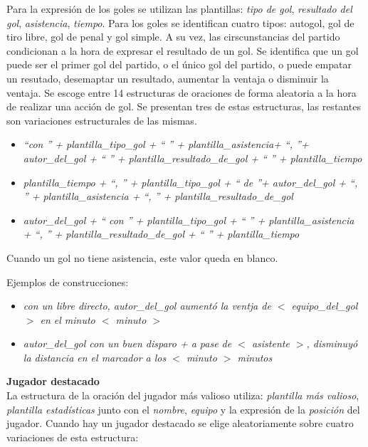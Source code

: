     Para la expresión de los goles se utilizan las plantillas: \textit{tipo de gol}, \textit{resultado del gol}, 
    \textit{asistencia}, \textit{tiempo}. Para los goles se identifican cuatro tipos: autogol, gol de tiro libre, 
    gol de penal y gol simple. A su vez, las cirscunstancias del partido condicionan a la hora de expresar el resultado 
    de un gol. Se identifica que un gol puede ser el primer gol del partido, o el único gol del partido, o puede empatar 
    un resutado, desemaptar un resultado, aumentar la ventaja o disminuir la ventaja.
    Se escoge entre 14 estructuras de oraciones de forma aleatoria a la hora de realizar una acción de gol. Se presentan tres 
    de estas estructuras, las restantes son variaciones estructurales de las mismas.
    

    \begin{itemize}
        \item \textit{ “con ” + plantilla\_tipo\_gol + “ ” + plantilla\_asistencia+ “, ”+ autor\_del\_gol + “ ” + plantilla\_resultado\_de\_gol + “ ” + plantilla\_tiempo}
        \item \textit{plantilla\_tiempo + “, ” + plantilla\_tipo\_gol + “ de ”+ autor\_del\_gol + “, ” + plantilla\_asistencia + “, ” + plantilla\_resultado\_de\_gol}
        \item \textit{autor\_del\_gol + “ con ” + plantilla\_tipo\_gol + “ ” + plantilla\_asistencia + “, ” + plantilla\_resultado\_de\_gol + “ ” + plantilla\_tiempo}
    \end{itemize}

    Cuando un gol no tiene asistencia, este valor queda en blanco.

    Ejemplos de construcciones:

    \begin{itemize}
        \item \textit{con un libre directo, autor\_del\_gol aumentó la ventja de $<$ equipo\_del\_gol $>$ en el minuto $<$ minuto $>$}
        \item \textit{autor\_del\_gol con un buen disparo + a pase de $<$ asistente $>$, disminuyó la distancia en el marcador a los $<$ minuto $>$ minutos} 
    \end{itemize}

\textbf{Jugador destacado}\\

    La estructura de la oración del jugador más valioso utiliza: \textit{plantilla más valioso}, \textit{plantilla estadísticas} junto con el \textit{nombre}, 
\textit{equipo} y la expresión de la  \textit{posición} del jugador.
    Cuando hay un jugador destacado se elige aleatoriamente sobre cuatro variaciones de esta estructura:
    
